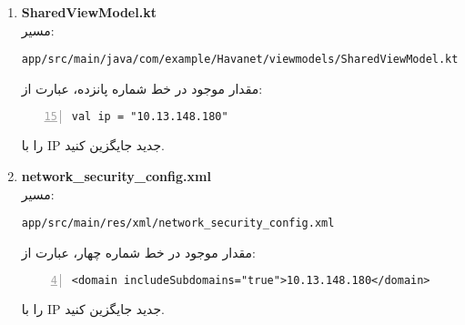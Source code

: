 \documentclass{report}
\begin{document}
\begin{enumerate}
	\item \textbf{SharedViewModel.kt}\\
	مسیر: \\
		\begin{latin}
	\texttt{app/src/main/java/com/example/Havanet/viewmodels/SharedViewModel.kt}\\
\end{latin}
مقدار موجود در خط شماره پانزده، عبارت از:
\begin{latin}
\begin{lstlisting}[mathescape=true, numbers=left, firstnumber=15]
val ip = "10.13.148.180"
\end{lstlisting}
\end{latin}
	را با IP جدید جایگزین کنید.
	
	\item \textbf{network\_security\_config.xml}\\
	مسیر: \\
		\begin{latin}
	\texttt{app/src/main/res/xml/network\_security\_config.xml}\\
		\end{latin}
	مقدار موجود در خط شماره چهار، عبارت از:
\begin{latin}
	\begin{lstlisting}[mathescape=true, numbers=left, firstnumber=4]
<domain includeSubdomains="true">10.13.148.180</domain>
	\end{lstlisting}
\end{latin}
	را با IP جدید جایگزین کنید.
\end{enumerate}



 
\end{document}
